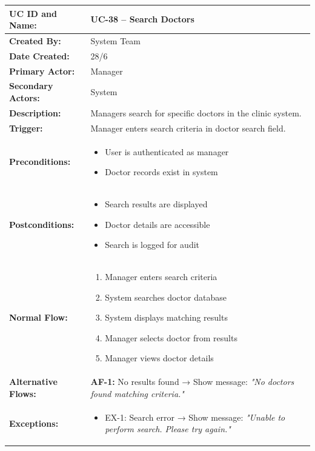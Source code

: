 \documentclass[12pt,a4paper]{article}
\begin{document}
\renewcommand{\arraystretch}{1.5}
\begin{longtable}{|p{4.5cm}|p{10.5cm}|}
\hline
\textbf{UC ID and Name:} & UC-38 – Search Doctors \\
\hline
\textbf{Created By:} & System Team \\
\hline
\textbf{Date Created:} & 28/6 \\
\hline
\textbf{Primary Actor:} & Manager \\
\hline
\textbf{Secondary Actors:} & System \\
\hline
\textbf{Description:} & Managers search for specific doctors in the clinic system. \\
\hline
\textbf{Trigger:} & Manager enters search criteria in doctor search field. \\
\hline
\textbf{Preconditions:} &
\begin{itemize}
  \item User is authenticated as manager
  \item Doctor records exist in system
\end{itemize} \\
\hline
\textbf{Postconditions:} &
\begin{itemize}
  \item Search results are displayed
  \item Doctor details are accessible
  \item Search is logged for audit
\end{itemize} \\
\hline
\textbf{Normal Flow:} &
\begin{enumerate}
  \item Manager enters search criteria
  \item System searches doctor database
  \item System displays matching results
  \item Manager selects doctor from results
  \item Manager views doctor details
\end{enumerate} \\
\hline
\textbf{Alternative Flows:} &
\textbf{AF-1:} No results found → Show message: \textit{"No doctors found matching criteria."} \\
\hline
\textbf{Exceptions:} &
\begin{itemize}
  \item EX-1: Search error → Show message: \textit{"Unable to perform search. Please try again."}
\end{itemize} \\

\end{longtable}
\end{document}
